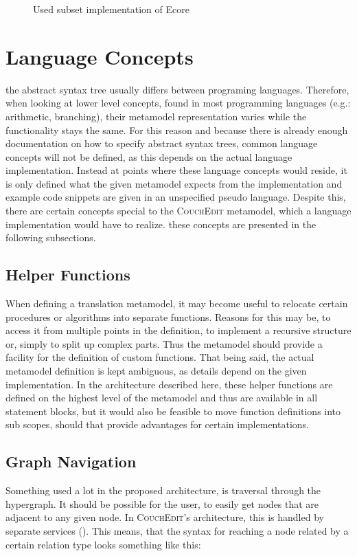 \begin{figure}
  \centering
  
  \caption{Used subset implementation of Ecore}
  \label{fig:csd-abstractsyntax}
\end{figure}


\section{Language Concepts}
\label{sec:language-concepts}
the abstract syntax tree usually differs between programing languages. Therefore, when looking at lower level concepts, found in most programming languages (e.g.: arithmetic, branching), their metamodel representation varies while the functionality stays the same. For this reason and because there is already enough documentation on how to specify abstract syntax trees, common language concepts will not be defined, as this depends on the actual language implementation. Instead at points where these language concepts would reside, it is only defined what the given metamodel expects from the implementation and example code snippets are given in an unspecified pseudo language. Despite this, there are certain concepts special to the \textsc{CouchEdit} metamodel, which a language implementation would have to realize. these concepts are presented in the following subsections.


\subsection{Helper Functions}
When defining a translation metamodel, it may become useful to relocate certain procedures or algorithms into separate functions. Reasons for this may be, to access it from multiple points in the definition, to implement a recursive structure or, simply to split up complex parts. Thus the metamodel should provide a facility for the definition of custom functions. That being said, the actual metamodel definition is kept ambiguous, as details depend on the given implementation. In the architecture described here, these helper functions are defined on the highest level of the metamodel and thus are available in all statement blocks, but it would also be feasible to move function definitions into sub scopes, should that provide advantages for certain implementations.

\subsection{Graph Navigation}
\label{sec:abstraction}
Something used a lot in the proposed architecture, is traversal through the hypergraph. It should be possible for the user, to easily get nodes that are adjacent to any given node. In \textsc{CouchEdit}'s architecture, this is handled by separate services (). This means, that the syntax for reaching a node related by a certain relation type looks something like this:

